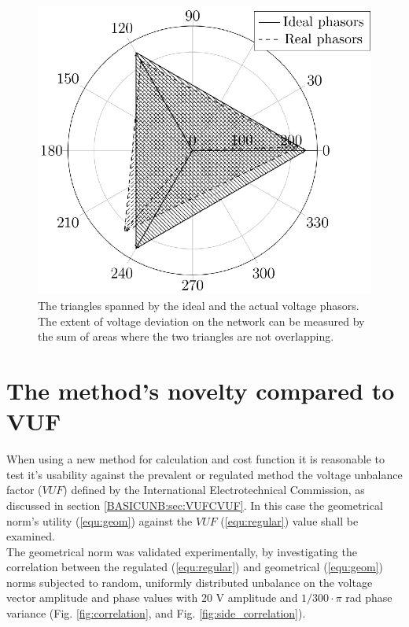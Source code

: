             \begin{figure}[!ht]
           \centering
           \includegraphics[scale=0.95]{Unblance_EPS_Pics/UnbalRedComp_JCP-figure1.eps}
           \caption{The triangles spanned by the ideal and the actual voltage phasors. The extent of voltage deviation on the network can be measured by the sum of areas where the two triangles are not overlapping.}
           \label{fig:threephase}
            \end{figure}

\section{The method's novelty compared to VUF}\label{VUB:sec:AdditionalContent}

When using a new method for calculation and cost function it is reasonable to test it's usability against the prevalent or regulated method the voltage unbalance factor ($VUF$) defined by the International Electrotechnical Commission, as discussed in section \ref{BASICUNB:sec:VUFCVUF}. In this case the geometrical norm's utility (\ref{equ:geom}) against the $VUF$ (\ref{equ:regular}) value shall be examined. \\
The geometrical norm was validated experimentally, by investigating the correlation between the regulated (\ref{equ:regular})  and geometrical (\ref{equ:geom}) norms subjected to random, uniformly distributed unbalance on the voltage vector amplitude and phase values with $20$ V amplitude and $1/300\cdot\pi$ rad phase variance (Fig. \ref{fig:correlation}, and Fig. \ref{fig:side_correlation}).

